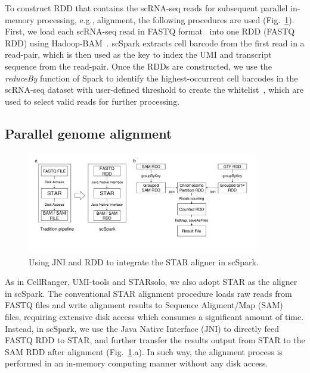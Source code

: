 \documentclass[conference]{IEEEtran}
\begin{document}
To construct RDD that contains the scRNA-seq reads for subsequent parallel in-memory processing, e.g., alignment, the following procedures are used (Fig.~\ref{fig1}).
First, we load each scRNA-seq read in FASTQ format~\cite{cock2010sanger} into one RDD (FASTQ RDD) using Hadoop-BAM~\cite{hadoopBAM}.
scSpark extracts cell barcode from the first read in a read-pair, which is then used as the key to index the UMI and transcript sequence from the read-pair.
Once the RDDs are constructed, we use the \textit{reduceBy} function of Spark to identify the highest-occurrent cell barcodes in the scRNA-seq dataset with user-defined threshold to create the whitelist~\cite{guo2018bioinformatics}, which are used to select valid reads for further processing. 

\subsection{Parallel genome alignment}
\begin{figure}
\centering
	\includegraphics[width=0.9\textwidth]{fig2-3.pdf}
	\caption{Using JNI and RDD to integrate the STAR aligner in scSpark.} \label{fig1}
\end{figure}


As in CellRanger, UMI-tools and STARsolo, we also adopt STAR as the aligner in scSpark.
The conventional STAR alignment procedure loads raw reads from FASTQ files and write alignment results to Sequence Aligment/Map (SAM)~\cite{li2009sequence} files, requiring extensive disk access which consumes a significant amount of time.
Instead, in scSpark, we use the Java Native Interface (JNI) 
to directly feed FASTQ RDD to STAR, and further transfer the results output from STAR to the SAM RDD after alignment (Fig.~\ref{fig1}.a). 
In such way, the alignment process is performed in an in-memory computing manner without any disk access. 
\end{document}
